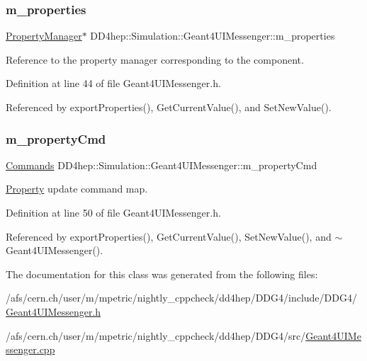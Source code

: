 \subsubsection{\texorpdfstring{m\+\_\+properties}{m\_properties}}
{\footnotesize\ttfamily \hyperlink{class_d_d4hep_1_1_property_manager}{Property\+Manager}$\ast$ D\+D4hep\+::\+Simulation\+::\+Geant4\+U\+I\+Messenger\+::m\+\_\+properties\hspace{0.3cm}{\ttfamily [protected]}}



Reference to the property manager corresponding to the component. 



Definition at line 44 of file Geant4\+U\+I\+Messenger.\+h.



Referenced by export\+Properties(), Get\+Current\+Value(), and Set\+New\+Value().

\hypertarget{class_d_d4hep_1_1_simulation_1_1_geant4_u_i_messenger_a79be5ed431c95728e21ba8119138dff0}{}\label{class_d_d4hep_1_1_simulation_1_1_geant4_u_i_messenger_a79be5ed431c95728e21ba8119138dff0} 
\subsubsection{\texorpdfstring{m\+\_\+property\+Cmd}{m\_propertyCmd}}
{\footnotesize\ttfamily \hyperlink{class_d_d4hep_1_1_simulation_1_1_geant4_u_i_messenger_a07e66059e5542ef6c393fda188f44907}{Commands} D\+D4hep\+::\+Simulation\+::\+Geant4\+U\+I\+Messenger\+::m\+\_\+property\+Cmd\hspace{0.3cm}{\ttfamily [protected]}}



\hyperlink{class_d_d4hep_1_1_property}{Property} update command map. 



Definition at line 50 of file Geant4\+U\+I\+Messenger.\+h.



Referenced by export\+Properties(), Get\+Current\+Value(), Set\+New\+Value(), and $\sim$\+Geant4\+U\+I\+Messenger().



The documentation for this class was generated from the following files\+:\begin{DoxyCompactItemize}
\item 
/afs/cern.\+ch/user/m/mpetric/nightly\+\_\+cppcheck/dd4hep/\+D\+D\+G4/include/\+D\+D\+G4/\hyperlink{_geant4_u_i_messenger_8h}{Geant4\+U\+I\+Messenger.\+h}\item 
/afs/cern.\+ch/user/m/mpetric/nightly\+\_\+cppcheck/dd4hep/\+D\+D\+G4/src/\hyperlink{_geant4_u_i_messenger_8cpp}{Geant4\+U\+I\+Messenger.\+cpp}\end{DoxyCompactItemize}
